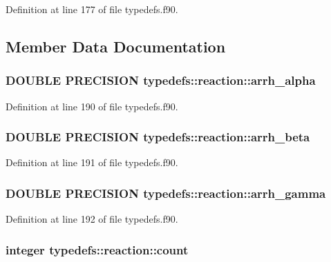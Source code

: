 Definition at line 177 of file typedefs.f90.

\subsection{Member Data Documentation}
\hypertarget{typetypedefs_1_1reaction_afad3fecf2c6d77ed2ea6b5fa543d5f15}{
\subsubsection[{arrh\_\-alpha}]{\setlength{\rightskip}{0pt plus 5cm}DOUBLE PRECISION {\bf typedefs::reaction::arrh\_\-alpha}}}
\label{typetypedefs_1_1reaction_afad3fecf2c6d77ed2ea6b5fa543d5f15}


Definition at line 190 of file typedefs.f90.\hypertarget{typetypedefs_1_1reaction_a60b4e74dafe033970715a08389f88525}{
\subsubsection[{arrh\_\-beta}]{\setlength{\rightskip}{0pt plus 5cm}DOUBLE PRECISION {\bf typedefs::reaction::arrh\_\-beta}}}
\label{typetypedefs_1_1reaction_a60b4e74dafe033970715a08389f88525}


Definition at line 191 of file typedefs.f90.\hypertarget{typetypedefs_1_1reaction_a48767e6765b50f472713bcafd23f4252}{
\subsubsection[{arrh\_\-gamma}]{\setlength{\rightskip}{0pt plus 5cm}DOUBLE PRECISION {\bf typedefs::reaction::arrh\_\-gamma}}}
\label{typetypedefs_1_1reaction_a48767e6765b50f472713bcafd23f4252}


Definition at line 192 of file typedefs.f90.\hypertarget{typetypedefs_1_1reaction_a5cc123e51b6e706aa00a46eb6ca5bddc}{
\subsubsection[{count}]{\setlength{\rightskip}{0pt plus 5cm}integer {\bf typedefs::reaction::count}}}
\label{typetypedefs_1_1reaction_a5cc123e51b6e706aa00a46eb6ca5bddc}


